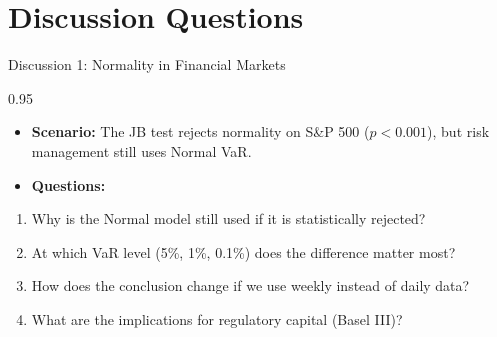 \documentclass[9pt, aspectratio=169, t]{beamer}
\begin{document}
\section{Discussion Questions}

\begin{frame}{Discussion 1: Normality in Financial Markets}
\begin{cminipage}{0.95\textwidth}
    \begin{itemize}\setlength{\itemsep}{0pt}
        \item \textbf{Scenario:} The JB test rejects normality on S\&P 500 ($p < 0.001$), but risk management still uses Normal VaR.
        \item \textbf{Questions:}
    \end{itemize}
    \begin{enumerate}\setlength{\itemsep}{0pt}
        \item Why is the Normal model still used if it is statistically rejected?
        \item At which VaR level (5\%, 1\%, 0.1\%) does the difference matter most?
        \item How does the conclusion change if we use weekly instead of daily data?
        \item What are the implications for regulatory capital (Basel III)?
    \end{enumerate}
\end{cminipage}
\end{frame}
\end{document}
